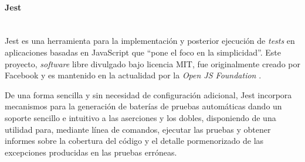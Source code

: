 \paragraph{Jest}\mbox{} \\
Jest es una herramienta para la implementación y posterior ejecución de \textit{tests} en aplicaciones basadas en JavaScript que ``pone el foco en la simplicidad''. Este proyecto, \textit{software} libre divulgado bajo licencia MIT, fue originalmente creado por Facebook y es mantenido en la actualidad por la \textit{Open JS Foundation} \cite{Jest}.

De una forma sencilla y sin necesidad de configuración adicional, Jest incorpora mecanismos para la generación de baterías de pruebas automáticas dando un soporte sencillo e intuitivo a las aserciones y los dobles, disponiendo de una utilidad para, mediante línea de comandos, ejecutar las pruebas y obtener informes sobre la cobertura del código y el detalle pormenorizado de las excepciones producidas en las pruebas erróneas.

